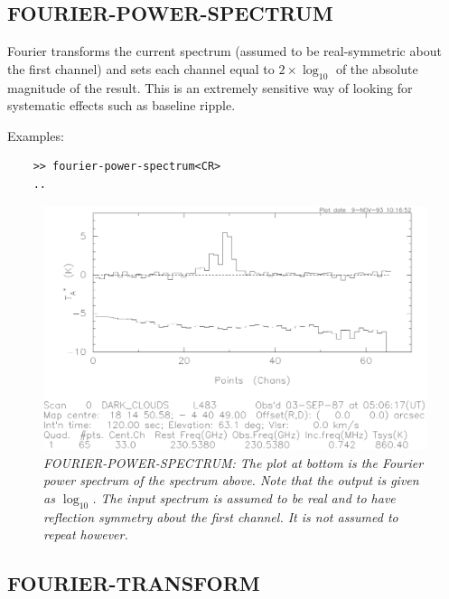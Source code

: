 \documentclass[11pt,twoside]{report}
\begin{document}
\subsection{FOURIER-POWER-SPECTRUM} 

Fourier transforms the current spectrum (assumed to be real-symmetric about
the first channel) and sets each channel equal to $2\times\log_{10}$ of the 
absolute magnitude of the result. This is an extremely sensitive
way of looking for systematic effects such as baseline ripple.

Examples:
\begin{verbatim}
    >> fourier-power-spectrum<CR>
    ..
\end{verbatim}

\begin{figure}[htbp]
\begin{center}
\includegraphics[scale=0.65]{f-p-s.ps}
\protect\parbox{5.5in}
{\caption[FPS]
{\sl
FOURIER-POWER-SPECTRUM: The plot at bottom is the Fourier power spectrum of the
spectrum above. Note that the output is given as $\log_{10}$. The input
spectrum is assumed to be real and to have reflection symmetry about the first
channel. It is not assumed to repeat however.
\label{FPS}
}
}
\end{center}
\end{figure}

\subsection{FOURIER-TRANSFORM} 
\end{document}
